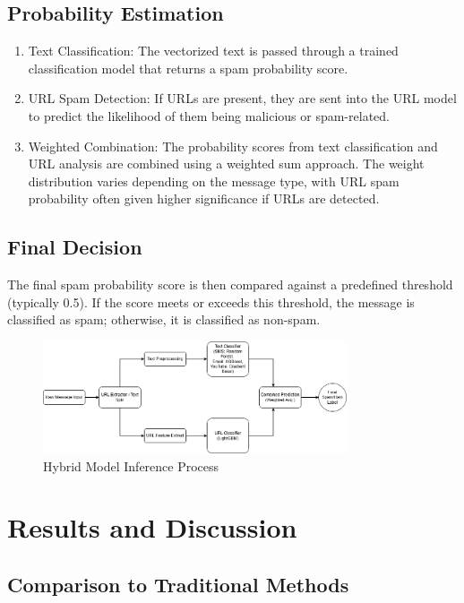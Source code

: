 \documentclass{article}
\begin{document}
\subsection{Probability Estimation}

\begin{enumerate}
    \item Text Classification: The vectorized text is passed through a trained classification model that returns a spam probability score.
    \item URL Spam Detection: If URLs are present, they are sent into the URL model to predict the likelihood of them being malicious or spam-related.
    \item Weighted Combination: The probability scores from text classification and URL analysis are combined using a weighted sum approach. The weight distribution varies depending on the message type, with URL spam probability often given higher significance if URLs are detected.
\end{enumerate}

\subsection{Final Decision}

The final spam probability score is then compared against a predefined threshold (typically 0.5). If the score meets or exceeds this threshold, the message is classified as spam; otherwise, it is classified as non-spam.

\begin{figure}[htbp]
    \centering
    \includegraphics[width=0.8\textwidth]{../analysis/Model_Pipeline_Flowchart.png}
    \caption{Hybrid Model Inference Process}
    \label{fig:inference_process}
\end{figure}

\section{Results and Discussion}
\subsection{Comparison to Traditional Methods}
\end{document}
